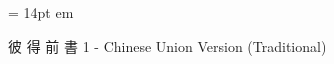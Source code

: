 
\FFrh \baselineskip = 14pt
 em


\centerline{  \FFbg
彼 得 前 書 1 - Chinese Union Version (Traditional) }



\bye

